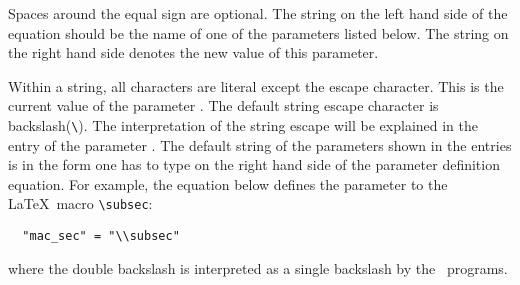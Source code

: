 Spaces around the equal sign are optional. The
string on the left hand side of the equation should be the name of one
of the parameters listed below. The string on the right hand side
denotes the new value of this parameter.

Within a string, all characters are literal except the escape
character. This is the current value of the parameter
. The default string escape character is
backslash(\verb|\|). The interpretation of the string escape will be
explained in the entry of the parameter . The
default string of the parameters shown in the entries is in the form
one has to type on the right hand side of the parameter definition
equation. For example, the equation below defines the parameter
 to the \LaTeX\ macro \verb|\subsec|:
\begin{verbatim}
  "mac_sec" = "\\subsec"
\end{verbatim}
where the double backslash is interpreted as a single backslash by the
\mweb\ programs.

\noindent\cmdrule

